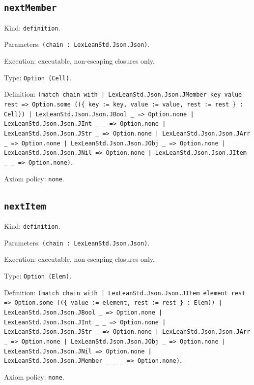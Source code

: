 \documentclass[11pt]{article}
\begin{document}
\subsection*{\texttt{nextMember}}
\noindent Kind: \texttt{definition}.\par
\noindent Parameters: \texttt{(chain : LexLeanStd.Json.Json)}.\par
\noindent Execution: executable, non-escaping closures only.\par
\noindent Type: \texttt{Option (Cell)}.\par
\noindent Definition: \texttt{(match chain with | LexLeanStd.Json.Json.JMember key value rest => Option.some ((\{ key := key, value := value, rest := rest \} : Cell)) | LexLeanStd.Json.Json.JBool \_ => Option.none | LexLeanStd.Json.Json.JInt \_ \_ => Option.none | LexLeanStd.Json.Json.JStr \_ => Option.none | LexLeanStd.Json.Json.JArr \_ => Option.none | LexLeanStd.Json.Json.JObj \_ => Option.none | LexLeanStd.Json.Json.JNil => Option.none | LexLeanStd.Json.Json.JItem \_ \_ => Option.none)}.\par
\noindent Axiom policy: \texttt{none}.\par
\subsection*{\texttt{nextItem}}
\noindent Kind: \texttt{definition}.\par
\noindent Parameters: \texttt{(chain : LexLeanStd.Json.Json)}.\par
\noindent Execution: executable, non-escaping closures only.\par
\noindent Type: \texttt{Option (Elem)}.\par
\noindent Definition: \texttt{(match chain with | LexLeanStd.Json.Json.JItem element rest => Option.some ((\{ value := element, rest := rest \} : Elem)) | LexLeanStd.Json.Json.JBool \_ => Option.none | LexLeanStd.Json.Json.JInt \_ \_ => Option.none | LexLeanStd.Json.Json.JStr \_ => Option.none | LexLeanStd.Json.Json.JArr \_ => Option.none | LexLeanStd.Json.Json.JObj \_ => Option.none | LexLeanStd.Json.Json.JNil => Option.none | LexLeanStd.Json.Json.JMember \_ \_ \_ => Option.none)}.\par
\noindent Axiom policy: \texttt{none}.\par
\end{document}
